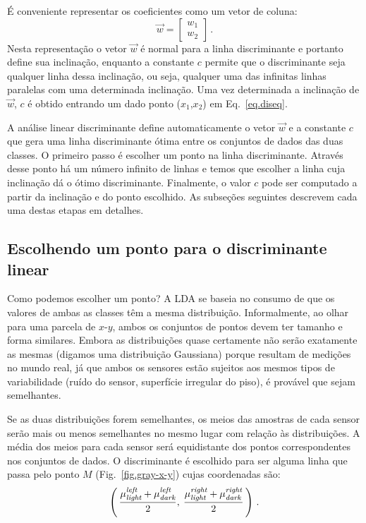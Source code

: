 É conveniente representar os coeficientes como um vetor de coluna:
\[
\vec{w} = \left[ \begin{array}{c} w_1\\w_2 \end{array} \right]\,.
\]
Nesta representação o vetor $\vec{w}$ é normal para a linha discriminante e portanto define sua inclinação, enquanto a constante $c$ permite que o discriminante seja qualquer linha dessa inclinação, ou seja, qualquer uma das infinitas linhas paralelas com uma determinada inclinação. Uma vez determinada a inclinação de $\vec{w}$, $c$ é obtido entrando um dado ponto ($x_1$,$x_2$) em Eq.~\ref{eq.diseq}.

A análise linear discriminante define automaticamente o vetor $\vec{w}$ e a constante $c$ que gera uma linha discriminante ótima entre os conjuntos de dados das duas classes. O primeiro passo é escolher um ponto na linha discriminante. Através desse ponto há um número infinito de linhas e temos que escolher a linha cuja inclinação dá o ótimo discriminante. Finalmente, o valor $c$ pode ser computado a partir da inclinação e do ponto escolhido. As subseções seguintes descrevem cada uma destas etapas em detalhes.

\subsection{Escolhendo um ponto para o discriminante linear}

Como podemos escolher um ponto? A LDA se baseia no {consumo} de que os valores de ambas as classes têm a mesma distribuição. Informalmente, ao olhar para uma parcela de $x$-$y$, ambos os conjuntos de pontos devem ter tamanho e forma similares. Embora as distribuições quase certamente não serão exatamente as mesmas (digamos uma distribuição Gaussiana) porque resultam de medições no mundo real, já que ambos os sensores estão sujeitos aos mesmos tipos de variabilidade (ruído do sensor, superfície irregular do piso), é provável que sejam semelhantes.

Se as duas distribuições forem semelhantes, os meios das amostras de cada sensor serão mais ou menos semelhantes no mesmo lugar com relação às distribuições. A média dos meios para cada sensor será equidistante dos pontos correspondentes nos conjuntos de dados. O discriminante é escolhido para ser alguma linha que passa pelo ponto $M$ (Fig.~\ref{fig.gray-x-y}) cujas coordenadas são:
\[
\left(\,
\frac{\mu_{\textit{\scriptsize light}}^{\textit{\scriptsize left }}+\mu_{\textit{\scriptsize dark}}^{\textit{\scriptsize left }}}{2},\:\frac{\mu_{\textit{\scriptsize light}}^{\textit{\scriptsize right}}+\mu_{\textit{\scriptsize dark}}^{\textit{\scriptsize right}}}{2}
\,\right)\,.
\]

